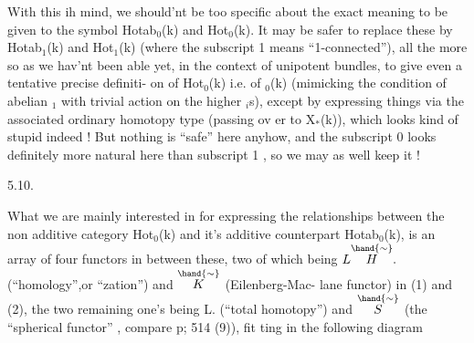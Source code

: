 With this ih mind, we should'nt be too specific  about the exact meaning
to be given to the symbol Hotab$_0$(k) and Hot$_0$(k). It may be safer 
to replace these by Hotab$_1$(k) and Hot$_1$(k) (where the subscript 1 means
``1-connected''), all the more so as we hav'nt been able yet, in the
context of unipotent bundles, to give even a tentative precise definiti-%
on of Hot$_0$(k) i.e. of $_0$(k) (mimicking the condition of abelian  \hand{$\pi$}$_1$
with trivial action on the higher \hand{$\pi$}$_i$s), except by expressing things
via the associated ordinary homotopy type (passing ov er to X$_*$(k)), which
looks kind of stupid indeed ! But nothing is ``safe'' here anyhow, and
the subscript 0 looks definitely more natural here than subscript 1 ,
so we may as well keep it !

5.10.

What we are mainly interested in\hand{,} for expressing the relationships
between the non additive category Hot$_0$(k) and it's additive counterpart
Hotab$_0$(k), is an array of four functors \hand{\unsure{,}}in between these, two of
which being $L\overset{\hand{\sim}}{H}.$ (``homology'',or ``\allowbreak{}zation'') and $\overset{\hand{\sim}}{K}$ (Eilenberg-Mac-%
lane functor) in (1) and (2), the two remaining one's being L\hand{$\pi$}. (``total
homotopy'') and $\overset{\hand{\sim}}{S}$ (the ``spherical functor'' , compare p; 514 (9)), fit%
ting in the following diagram



